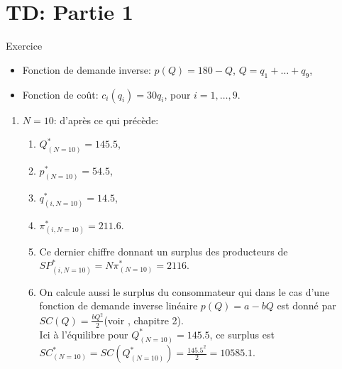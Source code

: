 \section{TD: Partie 1}
\frame{\sectionpage}
\begin{frame}[allowframebreaks]{Exercice}
    \begin{itemize}
        \item Fonction de demande inverse: $p(Q) = 180-Q$, $Q=q_1+\ldots + q_{9}$, 
        \item Fonction de coût: $c_i(q_i) = 30q_i$, pour $i=1, \ldots, 9$.
    \end{itemize}
    \begin{enumerate}
        \item $N = 10$: d'après ce qui précède:
        \begin{enumerate}[$\star$]
        \item $Q^*_{(N=10)} = 145.5$, 
        \item $p^*_{(N=10)}=54.5$, 
        \item $q_{(i, N=10)}^* = 14.5$,  
        \item $\pi_{(i, N=10)}^*= 211.6$. 
        \item Ce dernier chiffre donnant un surplus des producteurs de $SP_{(i, N=10)}^* = N\pi_{(N=10)}^*=2116$.
        \item  On calcule aussi le surplus du consommateur qui dans le cas d'une fonction de demande inverse 
        linéaire $p(Q) = a-bQ$ est donné par $SC(Q) = \frac{bQ^2}{2}$(voir \citet{belleflamme_peitz_2015}, chapitre 2).\\ Ici à l'équilibre 
        pour $Q^*_{(N=10)} = 145.5$,
         ce surplus est $SC_{(N=10)}^* = SC(Q_{(N=10)}^*) = \frac{145.5^2}{2}  = 10585.1$.
        \end{enumerate}
        

\end{enumerate}
\end{frame}
